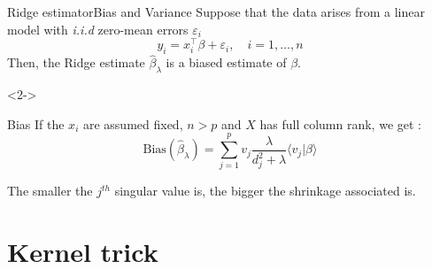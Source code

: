 \documentclass[10pt,aspectratio=43]{beamer}
\begin{document}
\begin{frame}{Ridge estimator}{Bias and Variance}
    Suppose that the data arises from a linear model with \emph{i.i.d} zero-mean errors $\varepsilon_i$
    $$ y_i = x_i^\top \beta + \varepsilon_i, \quad i=1, \dots, n$$
    Then, the Ridge estimate $\hat \beta_{\lambda}$ is a biased estimate of $\beta$.
    \begin{onlyenv}<2->
        \begin{block}{Bias}
            If the $x_i$ are assumed fixed, $n > p$ and $X$ has full column rank, we get :
            $$ \mathrm{Bias}(\hat \beta_\lambda) = \sum_{j=1}^p v_j \frac{\lambda}{d_j^2 + \lambda} \langle v_j \vert \beta \rangle $$
        \end{block}
        The smaller the $j^{th}$ singular value is, the bigger the shrinkage associated is.
    \end{onlyenv}
\end{frame}

\section{Kernel trick}
\end{document}
